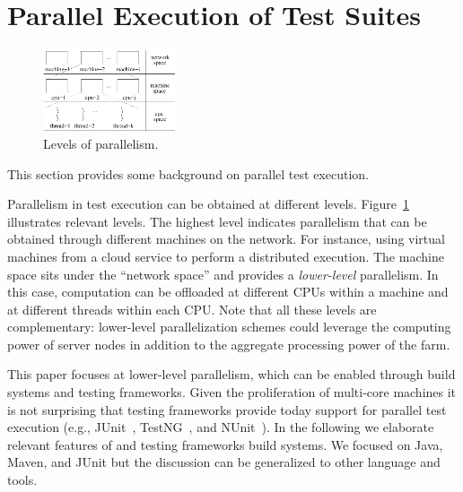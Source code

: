 \newcommand{\Seq}{L0}
\newcommand{\SeqClassParMeth}{L1}
\newcommand{\ParClassSeqMeth}{L2}
\newcommand{\ParClassParMeth}{L3}
\newcommand{\Fork}{F}
\newcommand{\ForkSeq}{\Fork{}\Seq{}}
\newcommand{\ForkParMeth}{\Fork{}\SeqClassParMeth{}}

\section{Parallel Execution of Test Suites}
\label{sec:modes}

\begin{figure}[t!]
  \centering
  \includegraphics[width=0.35\textwidth]{figs/parallel-levels.pdf}
  \vspace{-1ex}
  \caption{\label{fig:levels}Levels of parallelism.}
\end{figure}


This section provides some background on parallel test execution.

Parallelism in test execution can be obtained at different levels.
Figure~\ref{fig:levels} illustrates relevant levels.  The highest
level indicates parallelism that can be obtained through different
machines on the network.  For instance, using virtual machines from a
cloud service to perform a distributed execution.  The machine space
sits under the ``network space'' and provides a \emph{lower-level}
parallelism.  In this case, computation can be offloaded at different
CPUs within a machine and at different threads within each CPU.  Note
that all these levels are complementary:  lower-level parallelization
schemes could leverage the computing power of server nodes in addition
to the aggregate processing power of the farm.


This paper focuses at lower-level parallelism, which can be enabled
through build systems and testing frameworks.  Given the proliferation
of multi-core machines it is not surprising that testing frameworks
provide today support for parallel test execution (e.g.,
JUnit~\cite{junit-org}, TestNG~\cite{testng}, and NUnit~\cite{nunit}).
In the following we elaborate relevant features of and testing
frameworks build systems.  We focused on Java, Maven, and JUnit but
the discussion can be generalized to other language and tools.

